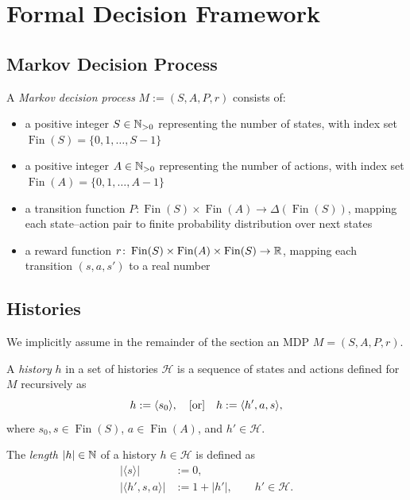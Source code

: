 \section{Formal Decision Framework}

\subsection{Markov Decision Process}

\newcommand{\Fin}{\operatorname{Fin}}

\begin{definition} \label{def:MDP}
A \emph{Markov decision process} $M := (S, A, P, r)$ consists of:
\begin{itemize}
  \item a positive integer $S \in \mathbb{N}_{>0}$ representing the number of states, with index set $\Fin(S) = \{0,1, \dots, S-1\}$
  \item a positive integer $A \in \mathbb{N}_{>0}$ representing the number of actions, with index set $\Fin(A) = \{0,1, \dots, A-1\}$
  \item a transition function $P \colon \Fin(S) \times \Fin(A) \to \Delta(\Fin(S))$, mapping each state–action pair to finite probability distribution over next states
  \item a reward function $r \colon \Fin(S) \times \Fin(A) \times \Fin(S) \to \Real$, mapping each transition \((s,a,s')\) to a real number
\end{itemize}
\end{definition}

\subsection{Histories}

We implicitly assume in the remainder of the section an MDP $M = (S, A, P, r)$.
\begin{definition} \label{def:Hist}
A \emph{history} $h$ in a set of histories $\mathcal{H}$ is a sequence of states and actions defined for $M$ recursively as
\[
  h := \langle s_0 \rangle, \quad
  \text{[or]} \quad
  h := \langle h', a, s \rangle,
\]
where $s_0, s \in \Fin(S)$, $a \in \Fin(A)$, and $h'\in \mathcal{H}$.
\end{definition}

\begin{definition} \label{def:hist-length}
The \emph{length} $|h|\in  \mathbb{N}$ of a history $h\in \mathcal{H}$ is defined as
\begin{align*}
|\langle s \rangle| &:= 0, \\
|\langle h', s, a \rangle| &:= 1 + |h'|, \qquad h' \in \mathcal{H}. 
\end{align*}
\end{definition}

